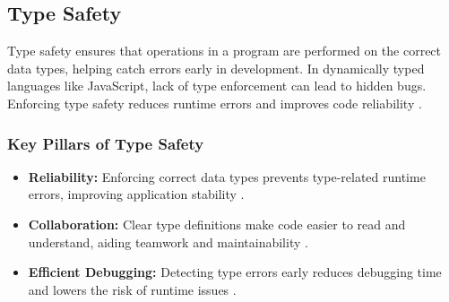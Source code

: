 \subsection{Type Safety}
\label{subsec:type-safety}

Type safety ensures that operations in a program are performed on the correct data types, helping catch errors early in development. In dynamically typed languages like JavaScript, lack of type enforcement can lead to hidden bugs. Enforcing type safety reduces runtime errors and improves code reliability \cite{dev:type-safety}.

\subsubsection*{Key Pillars of Type Safety}
\label{subsubsec:type-safety-pillars}

\begin{itemize}
\item \textbf{Reliability:} Enforcing correct data types prevents type-related runtime errors, improving application stability \cite{dev:type-safety}.

\item \textbf{Collaboration:} Clear type definitions make code easier to read and understand, aiding teamwork and maintainability \cite{dev:type-safety}.

\item \textbf{Efficient Debugging:} Detecting type errors early reduces debugging time and lowers the risk of runtime issues \cite{dev:type-safety}.
\end{itemize}
